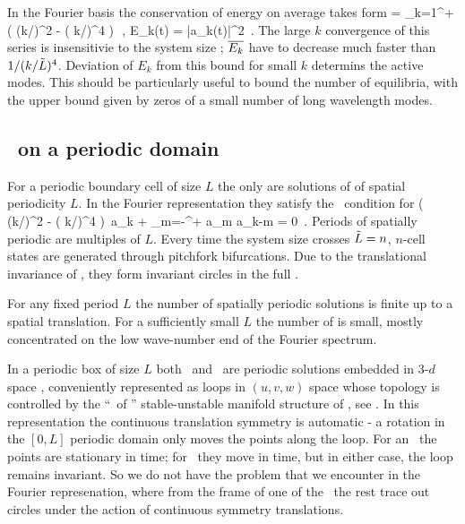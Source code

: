 In the Fourier basis  the conservation of energy on average
takes form
 = \sum_{k=1}^{+\infty} ( (k/\tildeL)^2 - ( k/\tildeL)^4 )\, 
\,,\qquad 
E_k(t) =  |a_k(t)|^2
\,.
The large $k$ convergence of this series is insensitivie to the
system size \tildeL; $\overline{E_k}$ have to decrease much faster than 
$1/( k/\tilde{L})^4$.
Deviation of $E_k$ from this bound for small $k$ determins the active modes.
This should be particularly useful to bound the number of equilibria, with
the upper bound given by zeros of a small number 
of long wavelength modes.
%

\subsection{\Eqva\ on a periodic domain}

For a periodic boundary cell of size 
$L$ the only {\eqva}  are
solutions of  of spatial periodicity $L$.
In the Fourier representation they satisfy 
the \eqv\ condition for 
\beq
( (k/\tildeL)^2 - ( k/\tildeL)^4 )\, a_k 
    +   \sum_{m=-\infty}^{+\infty} a_m a_{k-m}
  = 0
\,.
\label{eq:stfks}
\eeq 
Periods of spatially periodic {\eqva} are multiples of $L$.
Every time the system size crosses  $\tilde{L}=n$,
$n$-cell states
are generated through pitchfork bifurcations. 
Due to the translational invariance of {\KSe},
they form invariant circles
in the full \statesp.

For any fixed period $L$ the number 
of spatially periodic solutions is finite up to a spatial translation.
For a sufficiently small $L$ 
the number of {\eqva} is small,
mostly
concentrated on the low wave-number end of the Fourier spectrum.

In a periodic box of size $L$
both \eqva\ and \reqva\ are  periodic solutions 
embedded in 3-$d$ space , 
conveniently represented as loops in 
$(u,v,w)$ space whose topology is controlled by the
``\eqva\ of \eqva'' stable-unstable manifold structure of
, see .
In this representation the continuous translation symmetry
is automatic - a rotation in the $[0,L]$ periodic domain only
moves the points along the loop. For an \eqv\ the points
are stationary in time; for \reqv\ they move in time, but in
either case, the loop remains invariant.
So we do not have the problem that we encounter in the Fourier 
represenation, where from the frame of one of the \eqva\
the rest trace out circles under the action of continuous symmetry 
translations.



